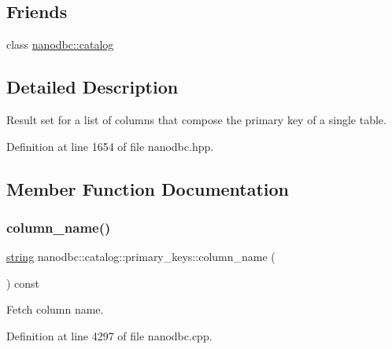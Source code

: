 \subsection*{Friends}
\begin{DoxyCompactItemize}
\item 
class \mbox{\hyperlink{classnanodbc_1_1catalog_1_1primary__keys_af0f3134c7f6f1f36bfe1e247318dfe43}{nanodbc\+::catalog}}
\end{DoxyCompactItemize}


\subsection{Detailed Description}
Result set for a list of columns that compose the primary key of a single table. 

Definition at line 1654 of file nanodbc.\+hpp.



\subsection{Member Function Documentation}
\mbox{\label{classnanodbc_1_1catalog_1_1primary__keys_a27c5a18b8efc9d0632da922bf826903c}} 
\subsubsection{\texorpdfstring{column\_name()}{column\_name()}}
{\footnotesize\ttfamily \mbox{\hyperlink{namespacenanodbc_abfc0ece56278e590911ec8352774c212}{string}} nanodbc\+::catalog\+::primary\+\_\+keys\+::column\+\_\+name (\begin{DoxyParamCaption}{ }\end{DoxyParamCaption}) const}



Fetch column name. 



Definition at line 4297 of file nanodbc.\+cpp.

\mbox{\label{classnanodbc_1_1catalog_1_1primary__keys_a433cd68a00686979966c4c9a0cf3efc4}} 
